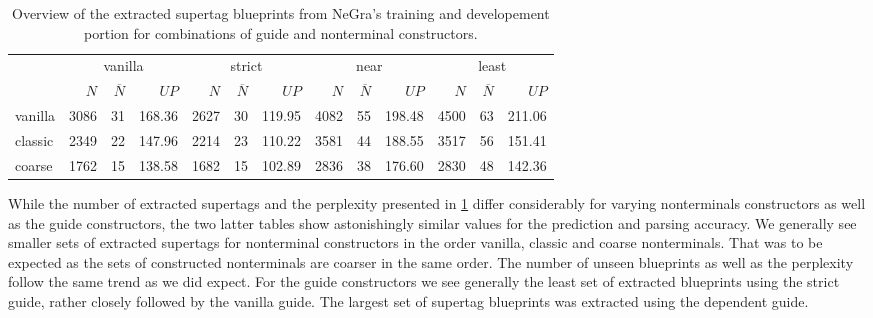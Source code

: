 \documentclass[../../document.tex]{subfiles}
\begin{document}
    \begin{table}
        \caption{\label{tbl:gridsearch:1:1}
            Overview of the extracted supertag blueprints from NeGra's training and developement portion for combinations of guide and nonterminal constructors.
        }
        \centering
        \setlength{\tabcolsep}{5pt}
        \vspace{.2cm}
        \begin{tabular}{l|rrr|rrr|rrr|rrr}
            \toprule
                        & \multicolumn{3}{c|}{vanilla} & \multicolumn{3}{c|}{strict} & \multicolumn{3}{c|}{near} & \multicolumn{3}{c}{least} \\
                        & $N$ & $\overline{N}$ & $\mathit{UP}$ & $N$ & $\overline{N}$ & $\mathit{UP}$ & $N$ & $\overline{N}$ & $\mathit{UP}$ & $N$ & $\overline{N}$ & $\mathit{UP}$ \\ \hline
            vanilla     & 3086 & 31 & 168.36 & 2627 & 30 & 119.95 & 4082 & 55 & 198.48 & 4500 & 63 & 211.06 \\
            classic     & 2349 & 22 & 147.96 & 2214 & 23 & 110.22 & 3581 & 44 & 188.55 & 3517 & 56 & 151.41 \\
            coarse      & 1762 & 15 & 138.58 & 1682 & 15 & 102.89 & 2836 & 38 & 176.60 & 2830 & 48 & 142.36 \\
            \bottomrule
        \end{tabular}
    \end{table}
    
    While the number of extracted supertags and the perplexity presented in \cref{tbl:gridsearch:1:1} differ considerably for varying nonterminals constructors as well as the guide constructors, the two latter tables show astonishingly similar values for the prediction and parsing accuracy.
    We generally see smaller sets of extracted supertags for nonterminal constructors in the order vanilla, classic and coarse nonterminals.
    That was to be expected as the sets of constructed nonterminals are coarser in the same order.
    The number of unseen blueprints as well as the perplexity follow the same trend as we did expect.
    For the guide constructors we see generally the least set of extracted blueprints using the strict guide, rather closely followed by the vanilla guide.
    The largest set of supertag blueprints was extracted using the dependent guide.
    
\end{document}
